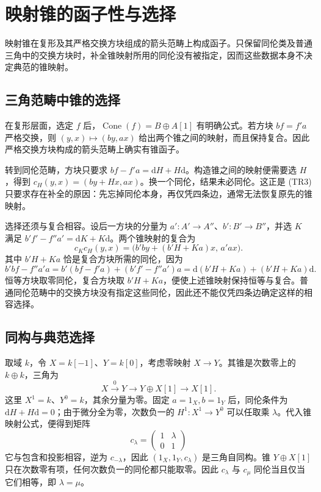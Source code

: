 
\section{映射锥的函子性与选择}
\label{b4:sec:1604}

映射锥在复形及其严格交换方块组成的箭头范畴上构成函子。只保留同伦类及普通三角中的交换方块时，补全锥映射所用的同伦没有被指定，因而这些数据本身不决定典范的锥映射。


%
%
%

\subsection{三角范畴中锥的选择}
\label{b4:subsec:1604:01}

在复形层面，选定 \(f\) 后，\(\operatorname{Cone}(f)=B\oplus A[1]\) 有明确公式。若方块 \(bf=f'a\) 严格交换，则 \((y,x)\mapsto(by,ax)\) 给出两个锥之间的映射，而且保持复合。因此严格交换方块构成的箭头范畴上确实有锥函子。

\ProseParagraphBreak
转到同伦范畴，方块只要求 \(bf-f'a=\mathrm{d}H+H\mathrm{d}\)。构造锥之间的映射便需要选 \(H\)，得到 \(c_H(y,x)=(by+Hx,ax)\)。换一个同伦，结果未必同伦。这正是 (TR3) 只要求存在补全的原因：先忘掉同伦本身，再仅凭四条边，通常无法恢复原先的锥映射。

\ProseParagraphBreak
选择还须与复合相容。设后一方块的分量为 \(a':A'\to A''\)、\(b':B'\to B''\)，并选 \(K\) 满足 \(b'f'-f''a'=\mathrm{d}K+K\mathrm{d}\)。两个锥映射的复合为
\[
	c_Kc_H(y,x)=\bigl(b'b y+(b'H+Ka)x,\,a'a x\bigr).
\]
其中 \(b'H+Ka\) 恰是复合方块所需的同伦，因为
\[
	b'b f-f''a'a =b'(bf-f'a)+(b'f'-f''a')a =\mathrm{d}(b'H+Ka)+(b'H+Ka)\mathrm{d}.
\]
恒等方块取零同伦，复合方块取 \(b'H+Ka\)，便使上述锥映射保持恒等与复合。普通同伦范畴中的交换方块没有指定这些同伦，因此还不能仅凭四条边确定这样的相容选择。

\subsection{同构与典范选择}
\label{b4:subsec:1604:02}

取域 \(k\)，令 \(X=k[-1]\)、\(Y=k[0]\)，考虑零映射 \(X\to Y\)。其锥是次数零上的 \(k\oplus k\)，三角为
\[
	X\xrightarrow{0}Y\longrightarrow Y\oplus X[1]\longrightarrow X[1].
\]
这里 \(X^1=k\)、\(Y^0=k\)，其余分量为零。固定 \(a=1_X,b=1_Y\) 后，同伦条件为 \(\mathrm{d}H+H\mathrm{d}=0\)；由于微分全为零，次数负一的 \(H^1:X^1\to Y^0\) 可以任取乘 \(\lambda\)。代入锥映射公式，便得到矩阵
\[
	c_\lambda=\begin{pmatrix}1&\lambda\\0&1\end{pmatrix}
\]
它与包含和投影相容，逆为 \(c_{-\lambda}\)，因此 \((1_X,1_Y,c_\lambda)\) 是三角自同构。锥 \(Y\oplus X[1]\) 只在次数零有项，任何次数负一的同伦都只能取零。因此 \(c_\lambda\) 与 \(c_\mu\) 同伦当且仅当它们相等，即 \(\lambda=\mu\)。

